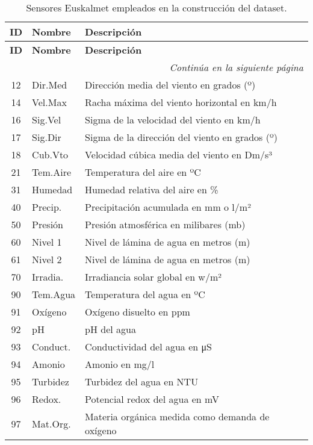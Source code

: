 \begin{longtable}{c l p{8.5cm}}
	\caption{Sensores Euskalmet empleados en la construcción del dataset.}
	\label{tab:sensores_euskalmet} \\
	\toprule
	\textbf{ID} & \textbf{Nombre} & \textbf{Descripción} \\
	\midrule
	\endfirsthead
	
	\toprule
	\textbf{ID} & \textbf{Nombre} & \textbf{Descripción} \\
	\midrule
	\endhead
	
	\midrule
	\multicolumn{3}{r}{\textit{Continúa en la siguiente página}} \\
	\midrule
	\endfoot
	
	\bottomrule
	\endlastfoot
	
	12 & Dir.Med & Dirección media del viento en grados (º) \\
	14 & Vel.Max & Racha máxima del viento horizontal en km/h \\
	16 & Sig.Vel & Sigma de la velocidad del viento en km/h \\
	17 & Sig.Dir & Sigma de la dirección del viento en grados (º) \\
	18 & Cub.Vto & Velocidad cúbica media del viento en Dm/s³ \\
	21 & Tem.Aire & Temperatura del aire en ºC \\
	31 & Humedad & Humedad relativa del aire en \% \\
	40 & Precip. & Precipitación acumulada en mm o l/m² \\
	50 & Presión & Presión atmosférica en milibares (mb) \\
	60 & Nivel 1 & Nivel de lámina de agua en metros (m) \\
	61 & Nivel 2 & Nivel de lámina de agua en metros (m) \\
	70 & Irradia. & Irradiancia solar global en w/m² \\
	90 & Tem.Agua & Temperatura del agua en ºC \\
	91 & Oxígeno & Oxígeno disuelto en ppm \\
	92 & pH & pH del agua \\
	93 & Conduct. & Conductividad del agua en μS \\
	94 & Amonio & Amonio en mg/l \\
	95 & Turbidez & Turbidez del agua en NTU \\
	96 & Redox. & Potencial redox del agua en mV \\
	97 & Mat.Org. & Materia orgánica medida como demanda de oxígeno \\

\end{longtable}
